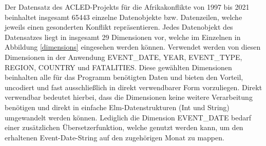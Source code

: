 \documentclass[usegeometry=true]{scrartcl}
\begin{document}
Der Datensatz des ACLED-Projekts für die Afrikakonflikte von 1997 bis 2021 beinhaltet insgesamt 65443 einzelne Datenobjekte bzw. Datenzeilen, welche jeweils einen gesonderten Konflikt repräsentieren. Jedes Datenobjekt des Datensatzes liegt in insgesamt 29 Dimensionen vor, welche im Einzelnen in Abbildung \ref{dimensions} eingesehen werden können. Verwendet werden von diesen Dimensionen in der Anwendung EVENT\_DATE, YEAR, EVENT\_TYPE, REGION, COUNTRY und FATALITIES. Diese gewählten Dimensionen beinhalten alle für das Programm benötigten Daten und bieten den Vorteil, uncodiert und fast ausschließlich in direkt verwendbarer Form vorzuliegen. Direkt verwendbar bedeutet hierbei, dass die Dimensionen keine weitere Verarbeitung benötigen und direkt in einfache Elm-Datenstrukturen (Int und String) umgewandelt werden können. Lediglich die Dimension EVENT\_DATE bedarf einer zusätzlichen Übersetzerfunktion, welche genutzt werden kann, um den erhaltenen Event-Date-String auf den zugehörigen Monat zu mappen.\\
\end{document}

